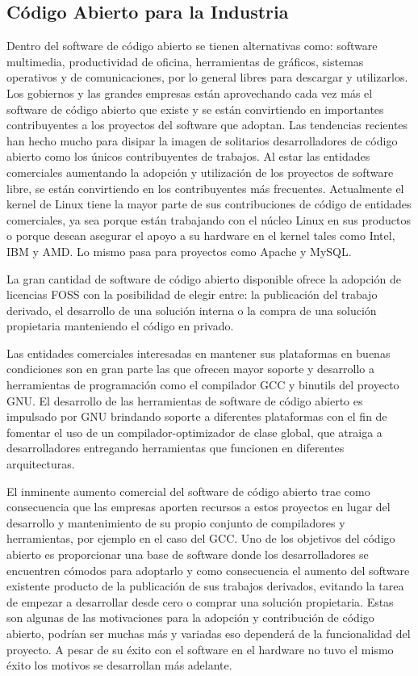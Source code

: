 	\subsection{Código Abierto para la Industria}

	Dentro del software de código abierto se tienen alternativas como: software multimedia, productividad de oficina, herramientas de
	gráficos, sistemas operativos y de comunicaciones, por lo general libres para descargar y utilizarlos. Los gobiernos y las grandes empresas están
	aprovechando cada vez más el software de código abierto que existe y se están convirtiendo en importantes contribuyentes a los proyectos del
	software que adoptan. Las tendencias recientes han hecho mucho para disipar la imagen de solitarios desarrolladores de código abierto como los
	únicos contribuyentes de trabajos. Al estar las entidades comerciales aumentando la adopción y utilización de los proyectos de software libre,  se
	están convirtiendo en los contribuyentes más frecuentes. Actualmente el kernel de Linux tiene la mayor parte de sus contribuciones de código de
	entidades comerciales, ya sea porque están trabajando con el núcleo Linux en sus productos o porque desean asegurar el apoyo a su hardware en el
	kernel tales como Intel,  IBM y AMD. Lo mismo pasa para proyectos como Apache y MySQL.

	La gran cantidad de software de código abierto disponible ofrece la adopción de licencias FOSS con la posibilidad de elegir entre: la publicación del
	trabajo derivado, el desarrollo de una solución interna o la compra de una solución propietaria manteniendo el código en privado.

 	Las entidades comerciales interesadas en mantener sus plataformas en buenas condiciones son en gran parte las que ofrecen mayor soporte y desarrollo
 	a herramientas de programación como el compilador GCC y binutils del proyecto GNU. El desarrollo de las herramientas de software de código abierto
 	es impulsado por GNU brindando soporte a diferentes plataformas con el fin de fomentar el uso de un compilador-optimizador de clase global, que
 	atraiga a desarrolladores entregando herramientas que funcionen en diferentes arquitecturas.

	El inminente aumento comercial del software de código abierto trae como consecuencia que las empresas aporten recursos a estos proyectos en lugar del
	desarrollo y mantenimiento de su propio conjunto de compiladores y herramientas, por ejemplo en el caso del GCC. Uno de los objetivos del código
	abierto es proporcionar una base de software donde los desarrolladores se encuentren cómodos para adoptarlo y como consecuencia el aumento del
	software existente producto de la publicación de sus trabajos derivados, evitando la tarea de empezar a desarrollar desde cero o comprar una solución
	propietaria. Estas son algunas de las motivaciones para la adopción y contribución de código abierto, podrían ser muchas más y variadas eso dependerá
	de la funcionalidad del proyecto. A pesar de su éxito con el software en el hardware no tuvo el mismo éxito los motivos se desarrollan más adelante.


